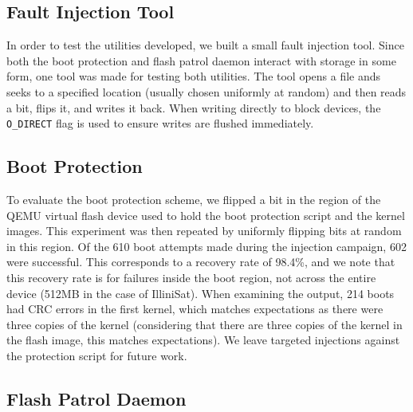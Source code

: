 \subsection{Fault Injection Tool}

In order to test the utilities developed, we built a small fault injection
tool.  Since both the boot protection and flash patrol daemon interact with
storage in some form, one tool was made for testing both utilities.  The tool
opens a file ands seeks to a specified location (usually chosen uniformly at
random) and then reads a bit, flips it, and writes it back.  When writing
directly to block devices, the {\texttt {O\_DIRECT}} flag is used to ensure
writes are flushed immediately.

\subsection{Boot Protection}
To evaluate the boot protection scheme, we flipped a bit in the region of the
QEMU virtual flash device used to hold the boot protection script and the kernel
images.  This experiment was then repeated by uniformly flipping bits at random
in this region.  Of the 610 boot attempts made during the injection campaign,
602 were successful.  This corresponds to a recovery rate of 98.4\%, and we note
that this recovery rate is for failures inside the boot region, not across the
entire device (512MB in the case of IlliniSat). When examining the output, 214
boots had CRC errors in the first kernel, which matches expectations as there
were three copies of the kernel (considering that there are three copies of the
kernel in the flash image, this matches expectations).  We leave targeted
injections against the protection script for future work.

\subsection{Flash Patrol Daemon}
